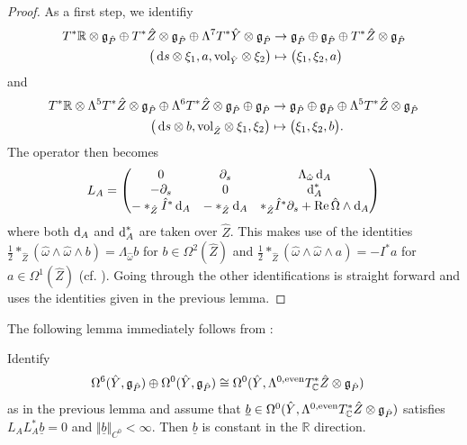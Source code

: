 \documentclass[11pt,a4paper]{scrartcl}
\newcommand*\diff{\mathop{}\!\textup{d}}
\newcommand{\vol}{\textup{vol}}
\newcommand{\VertC}[2]{\Vert_{C^{{#1}}{#2}}}
\newcommand{\re}{\textup{Re}\thinspace }
\numberwithin{equation}{section}
\theoremstyle{plain}
\theoremstyle{definition}
\theoremstyle{remark}
\begin{document}
\begin{lemma}
\end{lemma}

\begin{proof}
As a first step, we identifiy
\begin{align*}
T^*\mathbb{R}\otimes \mathfrak{g}_{\hat{P}} \oplus T^*\hat{Z}\otimes \mathfrak{g}_{\hat{P}} \oplus \Lambda^7T^* \hat{Y}\otimes \mathfrak{g}_{\hat{P}} &\to \mathfrak{g}_{\hat{P}} \oplus \mathfrak{g}_{\hat{P}} \oplus T^*\hat{Z} \otimes \mathfrak{g}_{\hat{P}} \\
\big(\diff s \otimes \xi_1, a,  \vol_{\hat{Y}} \otimes \xi_2 \big) & \mapsto \big(\xi_1,\xi_2, a \big)
\end{align*}
and
\begin{align*}
T^*\mathbb{R}\otimes \Lambda^5T^*\hat{Z}\otimes \mathfrak{g}_{\hat{P}} \oplus \Lambda^6
T^*\hat{Z}\otimes \mathfrak{g}_{\hat{P}} \oplus \mathfrak{g}_{\hat{P}} &\to \mathfrak{g}_{\hat{P}} \oplus \mathfrak{g}_{\hat{P}} \oplus \Lambda^5 T^*\hat{Z} \otimes \mathfrak{g}_{\hat{P}} \\
\big(\diff s \otimes b,  \vol_{\hat{Z}} \otimes \xi_1, \xi_2  \big) & \mapsto \big(\xi_1,\xi_2, b \big).
\end{align*}
The operator then becomes
\begin{align*}
L_A = \begin{pmatrix}
0 & \partial_s & \Lambda_{\hat{\omega}}\diff_A \\
-\partial_s & 0 & \diff_A^*  \\
- *_{\hat{Z}}\hat{I}^*\diff_A & -*_{\hat{Z}} \diff_A & *_{\hat{Z}} \hat{I}^* \partial_s + \re \hat{\Omega} \wedge \diff_A
\end{pmatrix}
\end{align*}
where both $\diff_A$ and $\diff_A^*$ are taken over $\hat{Z}$. This makes use of the identities $\frac{1}{2} *_{\hat{Z}} (\hat{\omega}\wedge\hat{\omega}\wedge b) = \Lambda_{\hat{\omega}} b$ for $b \in \Omega^2(\hat{Z})$
and $\frac{1}{2} *_{\hat{Z}}(\hat{\omega}\wedge\hat{\omega}\wedge a)= -I^*a$ for $a\in \Omega^1(\hat{Z})$ (cf. \cite[Chapter~1.2]{Huybrechts-Complex}). Going through the other identifications is straight forward and uses the identities given in the previous lemma.
\end{proof}


The following lemma immediately follows from \cite[Lemma~7.10]{Walpuski-InstantonsKummer}:
\begin{lemma}
Identify \begin{align*}
\Omega^6(\hat{Y},\mathfrak{g}_{\hat{P}}) \oplus \Omega^0(\hat{Y},\mathfrak{g}_{\hat{P}}) &\cong \Omega^0(\hat{Y},\Lambda^{0,\textup{even}}T^*_\mathbb{C}\hat{Z} \otimes \mathfrak{g}_{\hat{P}})
\end{align*} 
as in the previous lemma and assume that $\underline{b} \in \Omega^0(\hat{Y},\Lambda^{0,\textup{even}}T^*_\mathbb{C}\hat{Z} \otimes \mathfrak{g}_{\hat{P}})$ satisfies $L_AL_A^* \underline{b}=0$ and $\Vert \underline{b}\VertC{0}{} < \infty$. Then $\underline{b}$ is constant in the $\mathbb{R}$ direction.
\end{lemma}
\end{document}
